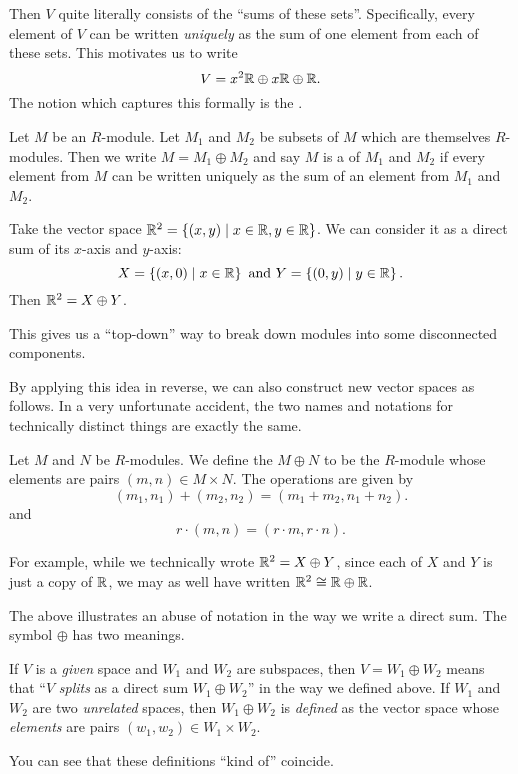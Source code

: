 Then $V$ quite literally consists of the ``sums of these sets''.
Specifically, every element of $V$ can be written \emph{uniquely}
as the sum of one element from each of these sets.
This motivates us to write
\[ V = x^2\mathbb R \oplus x\mathbb R \oplus \mathbb R. \]
The notion which captures this formally is the .

\begin{definition}
	Let $M$ be an $R$-module.
	Let $M_1$ and $M_2$ be subsets of $M$ which are themselves $R$-modules.
	Then we write $M = M_1 \oplus M_2$ and say $M$ is a 
	of $M_1$ and $M_2$
	if every element from $M$ can be written uniquely as the sum
	of an element from $M_1$ and $M_2$.
\end{definition}
\begin{example}
	Take the vector space $\mathbb R^2 = \left\{ (x,y) \mid x \in \mathbb R, y \in \mathbb R \right\}$.
	We can consider it as a direct sum of its $x$-axis and $y$-axis:
	\[ X = \left\{ (x,0) \mid x \in \mathbb R  \right\} 
		\text{ and }
		Y = \left\{ (0,y) \mid y \in \mathbb R \right\}. \]
	Then $\mathbb R^2 = X \oplus Y$.
\end{example}

This gives us a ``top-down'' way to break down modules
into some disconnected components.

By applying this idea in reverse, we can also construct
new vector spaces as follows.
In a very unfortunate accident, the two names and notations for technically
distinct things are exactly the same.
\begin{definition}
	Let $M$ and $N$ be $R$-modules.
	We define the  $M \oplus N$
	to be the $R$-module whose elements are pairs $(m,n) \in M \times N$.
	The operations are given by
	\[ (m_1, n_1) + (m_2, n_2) = (m_1+m_2, n_1+n_2). \]
	and
	\[ r \cdot (m, n) = (r \cdot m, r \cdot n). \]
\end{definition}

For example, while we technically wrote $\mathbb R^2 = X \oplus Y$,
since each of $X$ and $Y$ is just a copy of $\mathbb R$,
we may as well have written $\mathbb R^2 \cong \mathbb R \oplus \mathbb R$.

\begin{abuse}
	The above illustrates an abuse of notation in the way we write a direct sum. The symbol $\oplus$ has two meanings.
	\begin{itemize}
		\ii If $V$ is a \emph{given} space and $W_1$ and $W_2$ are subspaces, then $V = W_1 \oplus W_2$ means that ``$V$ \emph{splits} as a direct sum $W_1 \oplus W_2$'' in the way we defined above.
		\ii If $W_1$ and $W_2$ are two \emph{unrelated} spaces, then $W_1 \oplus W_2$ is \emph{defined} as the vector space whose \emph{elements} are pairs $(w_1, w_2) \in W_1 \times W_2$.
	\end{itemize}
	You can see that these definitions ``kind of'' coincide.
\end{abuse}

